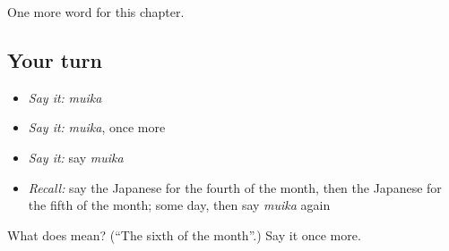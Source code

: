 \begin{grammarlens}[title={What you've built}]
One more word for this chapter.
\end{grammarlens}

\subsection*{Your turn}
\begin{itemize}
\raggedright
  \item \emph{Say it:} \emph{muika}
  \item \emph{Say it:} \emph{muika}, once more
  \item \emph{Say it:} say \emph{muika}
  \item \emph{Recall:} say the Japanese for the fourth of the month, then the Japanese for the fifth of the month; some day, then say \emph{muika} again
\end{itemize}

\begin{tcolorbox}[breakable,colback=teal!4,colframe=teal!35!black,title={Before you move on}]
What does  mean? (\textquotedblleft{}The sixth of the month\textquotedblright{}.) Say it once more.
\end{tcolorbox}
